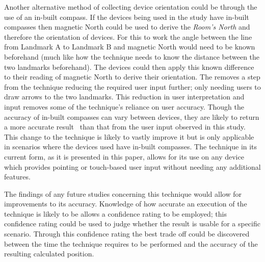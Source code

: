 \documentclass{bmcart}
\begin{document}
Another alternative method of collecting device orientation could be through the use of an in-built compass.
If the devices being used in the study have in-built compasses then magnetic North could be used to derive the \emph{Room's North} and therefore the orientation of devices.
For this to work the angle between the line from Landmark A to Landmark B and magnetic North would need to be known beforehand (much like how the technique needs to know the distance between the two landmarks beforehand).
The devices could then apply this known difference to their reading of magnetic North to derive their orientation.
The removes a step from the technique reducing the required user input further; only needing users to draw arrows to the two landmarks.
This reduction in user interpretation and input removes some of the technique's reliance on user accuracy.
Though the accuracy of in-built compasses can vary between devices, they are likely to return a more accurate result~\cite{Hwang2012} than that from the user input observed in this study.
This change to the technique is likely to vastly improve it but is only applicable in scenarios where the devices used have in-built compasses.
The technique in its current form, as it is presented in this paper, allows for its use on any device which provides pointing or touch-based user input without needing any additional features.

The findings of any future studies concerning this technique would allow for improvements to its accuracy.
Knowledge of how accurate an execution of the technique is likely to be allows a confidence rating to be employed; this confidence rating could be used to judge whether the result is usable for a specific scenario.
Through this confidence rating the best trade off could be discovered between the time the technique requires to be performed and the accuracy of the resulting calculated position.


\end{document}
